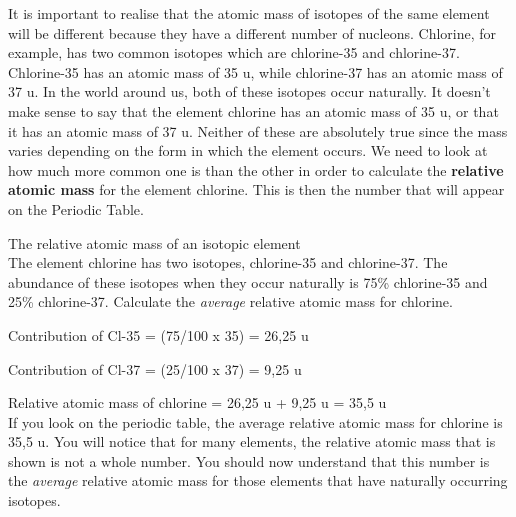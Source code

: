 It is important to realise that the atomic mass of isotopes of the same element will be different because they have a different number of nucleons. Chlorine, for example, has two common isotopes which are chlorine-35 and chlorine-37. Chlorine-35 has an atomic mass of 35 u, while chlorine-37 has an atomic mass of 37 u. In the world around us, both of these isotopes occur naturally. It doesn't make sense to say that the element chlorine has an atomic mass of 35 u, or that it has an atomic mass of 37 u. Neither of these are absolutely true since the mass varies depending on the form in which the element occurs. We need to look at how much more common one is than the other in order to calculate the \textbf{relative atomic mass} for the element chlorine. This is then the number that will appear on the Periodic Table.


\begin{wex}{The relative atomic mass of an isotopic element\\}{
The element chlorine has two isotopes, chlorine-35 and chlorine-37. The abundance of these isotopes when they occur naturally is 75\% chlorine-35 and 25\% chlorine-37. Calculate the \textit{average} relative atomic mass for chlorine.\\
}

{

Contribution of Cl-35 = (75/100 x 35) = 26,25 u\\
}
{

Contribution of Cl-37 = (25/100 x 37) = 9,25 u\\
}

{

Relative atomic mass of chlorine = 26,25 u + 9,25 u = 35,5 u \\

If you look on the periodic table, the average relative atomic mass for chlorine is 35,5 u. You will notice that for many elements, the relative atomic mass that is shown is not a whole number. You should now understand that this number is the \textit{average} relative atomic mass for those elements that have naturally occurring isotopes.}
\end{wex}

